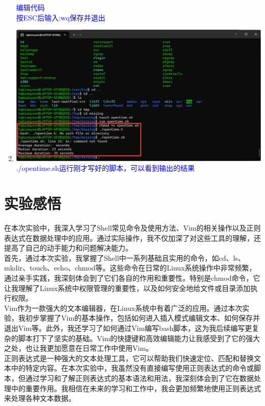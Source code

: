 \documentclass[12pt,a4paper,UTF8]{article}
\begin{document}
\begin{enumerate}
        \textcolor{blue}{编辑代码}\\
        \textcolor{blue}{按ESC后输入:wq保存并退出}\\[8pt]
        \item 
        \includegraphics[scale=0.25]{pictures/Shell/7_4.png}
        \textcolor{blue}{./opentime.sh运行刚才写好的脚本，可以看到输出的结果}
    \end{enumerate}

    \section{实验感悟}
    在本次实验中，我深入学习了Shell常见命令及使用方法、Vim的相关操作以及正则表达式在数据处理中的应用。通过实际操作，我不仅加深了对这些工具的理解，还提高了自己的动手能力和问题解决能力。\\
    首先，通过本次实验，我掌握了Shell中一系列基础且实用的命令，如cd、ls、mkdir、touch、echo、chmod等。这些命令在日常的Linux系统操作中非常频繁，通过亲手实践，我深刻体会到了它们各自的作用和重要性。特别是chmod命令，它让我理解了Linux系统中权限管理的重要性，以及如何安全地给文件或目录添加执行权限。\\
    Vim作为一款强大的文本编辑器，在Linux系统中有着广泛的应用。通过本次实验，我初步掌握了Vim的基本操作，包括如何进入插入模式编辑文本、如何保存并退出Vim等。此外，我还学习了如何通过Vim编写bash脚本，这为我后续编写更复杂的脚本打下了坚实的基础。Vim的快捷键和高效编辑能力让我感受到了它的强大之处，也让我更加愿意在日常工作中使用Vim。\\
    正则表达式是一种强大的文本处理工具，它可以帮助我们快速定位、匹配和替换文本中的特定内容。在本次实验中，我虽然没有直接编写使用正则表达式的命令或脚本，但通过学习和了解正则表达式的基本语法和用法，我深刻体会到了它在数据处理中的重要作用。我相信在未来的学习和工作中，我会更加频繁地使用正则表达式来处理各种文本数据。
\end{document}
